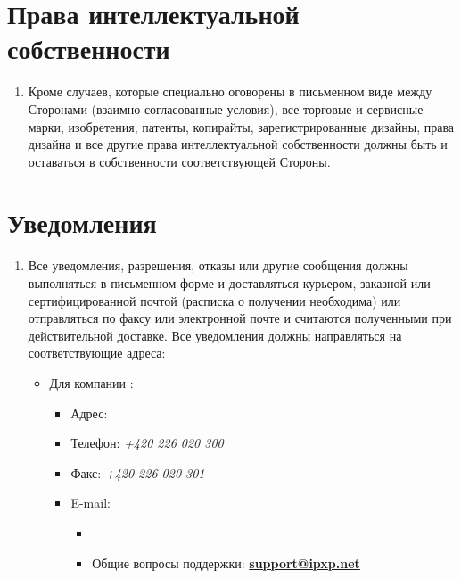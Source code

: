 \begin{Form}
    \section{Права интеллектуальной собственности}
        \begin{enumerate}[label=\thesection.\arabic*.]
         \item Кроме случаев, которые специально оговорены в письменном виде между Сторонами  (взаимно согласованные условия), все
               торговые и сервисные марки, изобретения, патенты, копирайты, зарегистрированные дизайны, права дизайна и все другие
               права интеллектуальной собственности должны быть и оставаться в собственности соответствующей Стороны.
        \end{enumerate}

    \section{Уведомления}%
        \begin{enumerate}[label=\thesection.\arabic*.]
         \item Все уведомления, разрешения, отказы или другие сообщения должны выполняться в письменном форме и доставляться курьером,
               заказной или сертифицированной почтой (расписка о получении необходима) или отправляться по факсу или электронной
               почте и считаются полученными при действительной доставке. Все уведомления должны направляться на
               соответствующие адреса: %
               \begin{itemize}
                \item Для компании \textbf{\ipxpname}:
                      \begin{itemize}
                        \item Адрес: \textit{\ipxpaddress}
                        \item Телефон: \textit{+420 226 020 300}
                        \item Факс: \textit{+420 226 020 301}
                        \item E-mail:
                            \begin{itemize}
                              \item {}
                                {\underline{\TextField[name=ipxpmanager,charsize=10pt,width=\fieldlength,height=1em,borderwidth=0,bordercolor={1 1 1}]{}}}
                              \item Общие вопросы поддержки: \href{mailto:support@ipxp.net}{\textbf{support@ipxp.net}}

\end{itemize}
\end{itemize}
\end{itemize}
\end{enumerate}
\end{Form}
